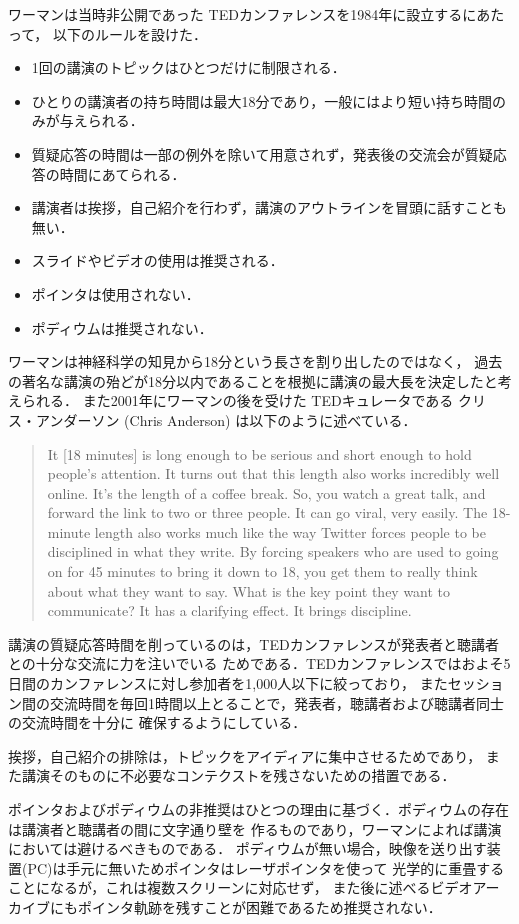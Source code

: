 \documentclass[submit,techreq,jkeyword,noauthor]{ipsj}
\newcommand{\TED}{\textrm{TED}}
\begin{document}
ワーマンは当時非公開であった \TED カンファレンスを1984年に設立するにあたって，
以下のルールを設けた．
\begin{itemize}
\item 1回の講演のトピックはひとつだけに制限される．
\item ひとりの講演者の持ち時間は最大18分であり，一般にはより短い持ち時間のみが与えられる．
\item 質疑応答の時間は一部の例外を除いて用意されず，発表後の交流会が質疑応答の時間にあてられる．
\item 講演者は挨拶，自己紹介を行わず，講演のアウトラインを冒頭に話すことも無い．
\item スライドやビデオの使用は推奨される．
\item ポインタは使用されない．
\item ポディウムは推奨されない．
\end{itemize}
ワーマンは神経科学の知見から18分という長さを割り出したのではなく，
過去の著名な講演の殆どが18分以内であることを根拠に講演の最大長を決定したと考えられる．\cite{cg}
また2001年にワーマンの後を受けた \TED キュレータである
クリス・アンダーソン (Chris Anderson) は以下のように述べている．\cite{cgweb}
\begin{quote}
It [18 minutes] is long enough to be serious and short enough to hold people's attention.
It turns out that this length also works incredibly well online. It's the length of a 
coffee break. So, you watch a great talk, and forward the link to two or three people. 
It can go viral, very easily. The 18-minute length also works much like the way Twitter 
forces people to be disciplined in what they write. By forcing speakers who are used to 
going on for 45 minutes to bring it down to 18, you get them to really think about what 
they want to say. What is the key point they want to communicate? It has a clarifying 
effect. It brings discipline.
\end{quote}

講演の質疑応答時間を削っているのは，\TED カンファレンスが発表者と聴講者との十分な交流に力を注いでいる
ためである．\TED カンファレンスではおよそ5日間のカンファレンスに対し参加者を1,000人以下に絞っており，
またセッション間の交流時間を毎回1時間以上とることで，発表者，聴講者および聴講者同士の交流時間を十分に
確保するようにしている．

挨拶，自己紹介の排除は，トピックをアイディアに集中させるためであり，
また講演そのものに不必要なコンテクストを残さないための措置である．

ポインタおよびポディウムの非推奨はひとつの理由に基づく．ポディウムの存在は講演者と聴講者の間に文字通り壁を
作るものであり，ワーマンによれば講演においては避けるべきものである．
ポディウムが無い場合，映像を送り出す装置(PC)は手元に無いためポインタはレーザポインタを使って
光学的に重畳することになるが，これは複数スクリーンに対応せず，
また後に述べるビデオアーカイブにもポインタ軌跡を残すことが困難であるため推奨されない．
\end{document}
